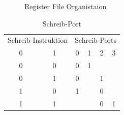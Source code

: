 \begin{figure}[htbp] 
	\centering
	
	\caption{Register File Organistaion}
	\label{fig:reg_orga}
\end{figure}

\begin{table}[htbp]
	
	\begin{minipage}{.4\textwidth}
		\flushleft
		\begin{tabular}{cccccc}
			\multicolumn{2}{l}{Schreib-Instruktion}                 & \multicolumn{4}{|l}{Schreib-Ports}                                                               \\ 
			\multicolumn{1}{c}{0} & \multicolumn{1}{c}{1} & \multicolumn{1}{|c}{0} & \multicolumn{1}{c}{1} & \multicolumn{1}{c}{2} & \multicolumn{1}{c}{3} \\ 
			\hline
			\multicolumn{1}{c}{0} & \multicolumn{1}{c}{0} & \multicolumn{1}{|c}{0} & \multicolumn{1}{c}{1} & \multicolumn{1}{c}{} & \multicolumn{1}{c}{} \\ 
			\multicolumn{1}{c}{0} & \multicolumn{1}{c}{1} & \multicolumn{1}{|c}{0} & \multicolumn{1}{c}{} & \multicolumn{1}{c}{1} & \multicolumn{1}{c}{} \\ 
			\multicolumn{1}{c}{1} & \multicolumn{1}{c}{0} & \multicolumn{1}{|c}{1} & \multicolumn{1}{c}{} & \multicolumn{1}{c}{0} & \multicolumn{1}{c}{} \\ 
			\multicolumn{1}{c}{1} & \multicolumn{1}{c}{1} & \multicolumn{1}{|c}{} & \multicolumn{1}{c}{} & \multicolumn{1}{c}{0} &  \multicolumn{1}{c}{1}                   
		\end{tabular}
		\caption{\label{fig::schreib-port}Schreib-Port}
	\end{minipage}
	\hfill
	\begin{minipage}{.4\textwidth}
		\flushleft
		

\end{minipage}
\end{table}
